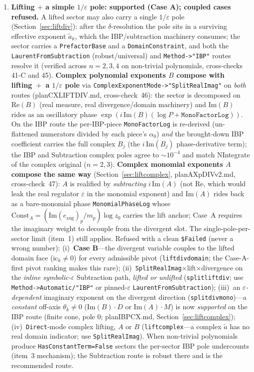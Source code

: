 \documentclass[11pt,a4paper]{article}
\begin{document}
\begin{enumerate}
\item \textbf{Lifting $+$ a simple $1/\varepsilon$ pole: supported (Case A); coupled cases refused.}
A lifted sector may also carry a single $1/\varepsilon$ pole (Section~\ref{sec:liftdiv}): after the $\delta$-resolution the pole sits in a surviving effective exponent $\tilde a_k$, which the IBP/subtraction machinery consumes; the sector carries a \texttt{PrefactorBase} and a \texttt{DomainConstraint}, and both the \texttt{LaurentFromSubtraction} (robust/universal) and \texttt{Method->"IBP"} routes resolve it (verified across $n=2,3,4$ on non-trivial polynomials, cross-checks 41-C and 45). \textbf{Complex polynomial exponents $B$ compose with lifting~$+$~a $1/\varepsilon$ pole} via \texttt{ComplexExponentMode->"SplitRealImag"} on \emph{both} routes (planCXLIFTDIV.md, cross-check~46): the sector is decomposed on $\mathrm{Re}(B)$ (real measure, real divergence/domain machinery) and $\mathrm{Im}(B)$ rides as an oscillatory phase $\exp(i\,\mathrm{Im}(B)(\log P + \texttt{MonoFactorLog}))$. On the IBP route the per-IBP-piece \texttt{MonoFactorLog} is re-derived (un-flattened numerators divided by each piece's $\alpha_0$) \emph{and} the brought-down IBP coefficient carries the full complex $B_j$ (the $i\,\mathrm{Im}(B_j)$ phase-derivative term); the IBP and Subtraction complex poles agree to $\sim 10^{-4}$ and match NIntegrate of the complex original ($n=2,3$). \textbf{Complex monomial exponents $A$ compose the same way} (Section~\ref{sec:liftcomplex}, planAXpDIVv2.md, cross-check~47): $A$ is realified by \emph{subtracting} $i\,\mathrm{Im}(A)$ (not $\mathrm{Re}$, which would leak the real regulator $\varepsilon$ in the monomial exponent) and $\mathrm{Im}(A)$ rides back as a bare-monomial phase \texttt{MonomialPhaseLog} whose $\mathrm{Const}_A=(\mathrm{Im}(e_{\mathrm{aug}})_p/m_p)\log z_0$ carries the lift anchor; Case~A requires the imaginary weight to decouple from the divergent slot. The single-pole-per-sector limit (item~1) still applies. Refused with a clean \texttt{\$Failed} (never a wrong number): (i)~\textbf{Case B}---the divergent variable couples to the lifted domain face ($\mathrm{ic}_k\neq 0$) for every admissible pivot (\texttt{liftdivdomain}; the Case-A-first pivot ranking makes this rare); (ii)~\texttt{SplitRealImag}$\times$lift$\times$divergence on the \emph{inline symbolic-}$\varepsilon$ Subtraction path, \emph{lifted or unlifted} (\texttt{splitliftdiv}; use \texttt{Method->Automatic/"IBP"} or pinned-$\varepsilon$ \texttt{LaurentFromSubtraction}); (iii)~an \emph{$\varepsilon$-dependent} imaginary exponent on the divergent direction (\texttt{splitdivmono})---a \emph{constant} off-axis $\theta_k\neq 0$ ($\mathrm{Im}(B)\!\cdot\!D$ or $\mathrm{Im}(A)\!\cdot\!M$) is now \emph{supported} on the IBP route (finite cone, pole $0$; planIBPCX.md, Section~\ref{sec:liftcomplex}); (iv)~\texttt{Direct}-mode complex lifting, $A$ or $B$ (\texttt{liftcomplex}---a complex $\tilde a$ has no real domain indicator; use \texttt{SplitRealImag}). When non-trivial polynomials produce \texttt{HasConstantTerm=False} sectors the per-sector IBP pole undercounts (item~3 mechanism); the Subtraction route is robust there and is the recommended route.


\end{enumerate}
\end{document}
